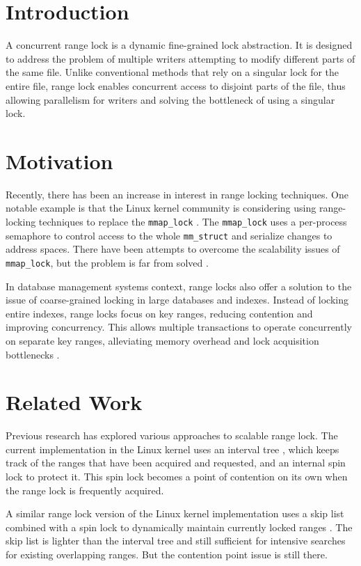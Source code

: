 \section{Introduction}

A concurrent range lock is a dynamic fine-grained lock abstraction. It is designed to address the problem of multiple writers attempting to modify different parts of the same file. Unlike conventional methods that rely on a singular lock for the entire file, range lock enables concurrent access to disjoint parts of the file, thus allowing parallelism for writers and solving the bottleneck of using a singular lock. 

\section{Motivation}
Recently, there has been an increase in interest in range locking techniques. One notable example is that the Linux kernel community is considering using range-locking techniques to replace the \texttt{mmap\_lock} \parencite{readerWriterLocks2017, mapleTree2021, mmapLock2022}. The \texttt{mmap\_lock} uses a per-process semaphore to control access to the whole \texttt{mm\_struct} \parencite{mmstruct2023} and serialize changes to address spaces. There have been attempts to overcome the scalability issues of \texttt{mmap\_lock}, but the problem is far from solved \parencite{mmapLock2022}.

In database management systems context, range locks also offer a solution to the issue of coarse-grained locking in large databases and indexes. Instead of locking entire indexes, range locks focus on key ranges, reducing contention and improving concurrency. This allows multiple transactions to operate concurrently on separate key ranges, alleviating memory overhead and lock acquisition bottlenecks \parencite{Graefe2020}.

\section{Related Work}
Previous research has explored various approaches to scalable range lock. The current
implementation in the Linux kernel uses an interval tree \parencite{linuxRangeLockImpl2013}, which keeps track of the ranges that have been acquired and requested, and an internal spin lock to protect it. This spin lock becomes a point of contention on its own when the range lock is frequently acquired. 

A similar range lock version of the Linux kernel implementation uses a skip list combined with a spin lock to dynamically maintain currently locked ranges \parencite{migrationWM2023}. The skip list is lighter than the interval tree and still sufficient for intensive searches for existing overlapping ranges. But the contention point issue is still there.

